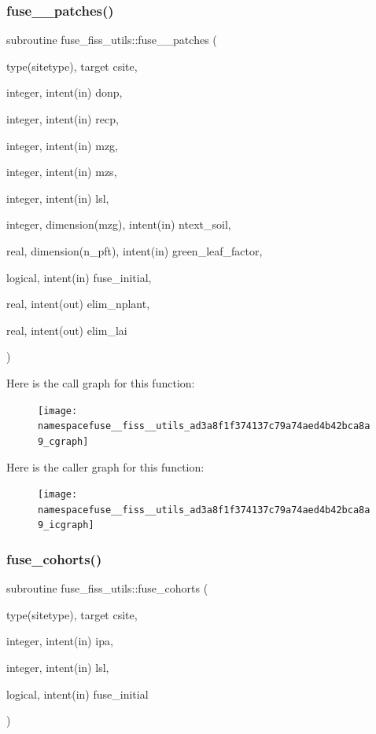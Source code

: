 \subsubsection{\texorpdfstring{fuse\+\_\+\_\+patches()}{fuse\_2\_patches()}}
{\footnotesize\ttfamily subroutine fuse\+\_\+fiss\+\_\+utils\+::fuse\+\_\+\_\+patches (\begin{DoxyParamCaption}\item[{type(sitetype), target}]{csite,  }\item[{integer, intent(in)}]{donp,  }\item[{integer, intent(in)}]{recp,  }\item[{integer, intent(in)}]{mzg,  }\item[{integer, intent(in)}]{mzs,  }\item[{integer, intent(in)}]{lsl,  }\item[{integer, dimension(mzg), intent(in)}]{ntext\+\_\+soil,  }\item[{real, dimension(n\+\_\+pft), intent(in)}]{green\+\_\+leaf\+\_\+factor,  }\item[{logical, intent(in)}]{fuse\+\_\+initial,  }\item[{real, intent(out)}]{elim\+\_\+nplant,  }\item[{real, intent(out)}]{elim\+\_\+lai }\end{DoxyParamCaption})}

Here is the call graph for this function\+:
\nopagebreak
\begin{figure}[H]
\begin{center}
\leavevmode
\texttt{[image: namespacefuse\_\_fiss\_\_utils\_ad3a8f1f374137c79a74aed4b42bca8a9\_cgraph]}
\end{center}
\end{figure}
Here is the caller graph for this function\+:
\nopagebreak
\begin{figure}[H]
\begin{center}
\leavevmode
\texttt{[image: namespacefuse\_\_fiss\_\_utils\_ad3a8f1f374137c79a74aed4b42bca8a9\_icgraph]}
\end{center}
\end{figure}
\mbox{\label{namespacefuse__fiss__utils_ad53341751380c44b17d1e7ec0a5ae824}} 
\subsubsection{\texorpdfstring{fuse\+\_\+cohorts()}{fuse\_cohorts()}}
{\footnotesize\ttfamily subroutine fuse\+\_\+fiss\+\_\+utils\+::fuse\+\_\+cohorts (\begin{DoxyParamCaption}\item[{type(sitetype), target}]{csite,  }\item[{integer, intent(in)}]{ipa,  }\item[{integer, intent(in)}]{lsl,  }\item[{logical, intent(in)}]{fuse\+\_\+initial }\end{DoxyParamCaption})}

